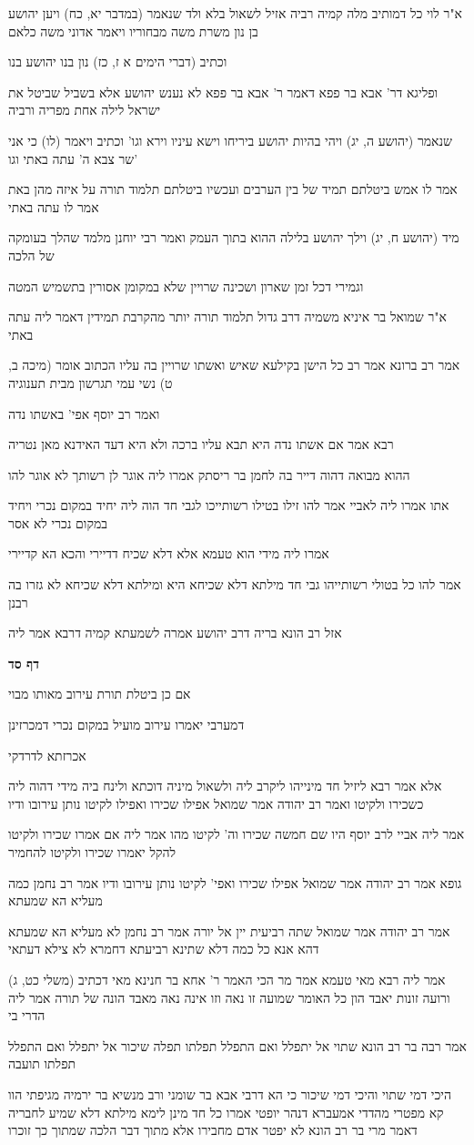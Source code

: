 \documentclass[12pt, openany]{book}
\newcommand{\sethebfont}{
\fontsize{10.5pt}{21.0pt} \selectfont
}
\newcommand{\textblock}[1]{
{\sethebfont #1\\}	
}
\newcommand{\sectname}{}
\newcommand{\newsection}[1]{
	\addcontentsline{toc}{section}{#1}
	\renewcommand{\sectname}{#1}	
	\vspace{-\baselineskip}
	\begin{center}
		\textbf{%
\fontsize{16pt}{16pt}\selectfont
			#1}
	\end{center}
	\vspace{-\baselineskip}
	\nopagebreak
}
\begin{document}
\textblock{א"ר לוי כל דמותיב מלה קמיה רביה אזיל לשאול בלא ולד שנאמר (במדבר יא, כח) ויען יהושע בן נון משרת משה מבחוריו ויאמר אדוני משה כלאם}
\textblock{וכתיב (דברי הימים א ז, כז) נון בנו יהושע בנו}
\textblock{ופליגא דר' אבא בר פפא דאמר ר' אבא בר פפא לא נענש יהושע אלא בשביל שביטל את ישראל לילה אחת מפריה ורביה}
\textblock{שנאמר (יהושע ה, יג) ויהי בהיות יהושע ביריחו וישא עיניו וירא וגו' וכתיב ויאמר (לו) כי אני שר צבא ה' עתה באתי וגו'}
\textblock{אמר לו אמש ביטלתם תמיד של בין הערבים ועכשיו ביטלתם תלמוד תורה על איזה מהן באת אמר לו עתה באתי}
\textblock{מיד (יהושע ח, יג) וילך יהושע בלילה ההוא בתוך העמק ואמר רבי יוחנן מלמד שהלך בעומקה של הלכה}
\textblock{וגמירי דכל זמן שארון ושכינה שרויין שלא במקומן אסורין בתשמיש המטה}
\textblock{א"ר שמואל בר איניא משמיה דרב גדול תלמוד תורה יותר מהקרבת תמידין דאמר ליה עתה באתי}
\textblock{אמר רב ברונא אמר רב כל הישן בקילעא שאיש ואשתו שרויין בה עליו הכתוב אומר (מיכה ב, ט) נשי עמי תגרשון מבית תענוגיה}
\textblock{ואמר רב יוסף אפי' באשתו נדה}
\textblock{רבא אמר אם אשתו נדה היא תבא עליו ברכה ולא היא דעד האידנא מאן נטריה}
\textblock{ההוא מבואה דהוה דייר בה לחמן בר ריסתק אמרו ליה אוגר לן רשותך לא אוגר להו}
\textblock{אתו אמרו ליה לאביי אמר להו זילו בטילו רשותייכו לגבי חד הוה ליה יחיד במקום נכרי ויחיד במקום נכרי לא אסר}
\textblock{אמרו ליה מידי הוא טעמא אלא דלא שכיח דדיירי והכא הא קדיירי}
\textblock{אמר להו כל בטולי רשותייהו גבי חד מילתא דלא שכיחא היא ומילתא דלא שכיחא לא גזרו בה רבנן}
\textblock{אזל רב הונא בריה דרב יהושע אמרה לשמעתא קמיה דרבא אמר ליה}
\newsection{דף סד}
\textblock{אם כן ביטלת תורת עירוב מאותו מבוי}
\textblock{דמערבי יאמרו עירוב מועיל במקום נכרי דמכרזינן}
\textblock{אכרזתא לדרדקי}
\textblock{אלא אמר רבא ליזיל חד מינייהו ליקרב ליה ולשאול מיניה דוכתא ולינח ביה מידי דהוה ליה כשכירו ולקיטו ואמר רב יהודה אמר שמואל אפילו שכירו ואפילו לקיטו נותן עירובו ודיו}
\textblock{אמר ליה אביי לרב יוסף היו שם חמשה שכירו וה' לקיטו מהו אמר ליה אם אמרו שכירו ולקיטו להקל יאמרו שכירו ולקיטו להחמיר}
\textblock{גופא אמר רב יהודה אמר שמואל אפילו שכירו ואפי' לקיטו נותן עירובו ודיו אמר רב נחמן כמה מעליא הא שמעתא}
\textblock{אמר רב יהודה אמר שמואל שתה רביעית יין אל יורה אמר רב נחמן לא מעליא הא שמעתא דהא אנא כל כמה דלא שתינא רביעתא דחמרא לא צילא דעתאי}
\textblock{אמר ליה רבא מאי טעמא אמר מר הכי האמר ר' אחא בר חנינא מאי דכתיב (משלי כט, ג) ורועה זונות יאבד הון כל האומר שמועה זו נאה וזו אינה נאה מאבד הונה של תורה אמר ליה הדרי בי}
\textblock{אמר רבה בר רב הונא שתוי אל יתפלל ואם התפלל תפלתו תפלה שיכור אל יתפלל ואם התפלל תפלתו תועבה}
\textblock{היכי דמי שתוי והיכי דמי שיכור כי הא דרבי אבא בר שומני ורב מנשיא בר ירמיה מגיפתי הוו קא מפטרי מהדדי אמעברא דנהר יופטי אמרו כל חד מינן לימא מילתא דלא שמיע לחבריה דאמר מרי בר רב הונא לא יפטר אדם מחבירו אלא מתוך דבר הלכה שמתוך כך זוכרו}
\end{document}
